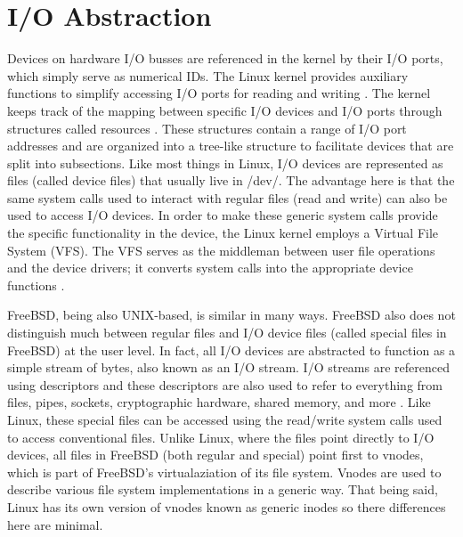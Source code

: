 \documentclass[onecolumn, draftclsnofoot,10pt, compsoc]{IEEEtran}
\begin{document}
\section{I/O Abstraction}
Devices on hardware I/O busses are referenced in the kernel by their I/O ports, which simply serve as numerical IDs. The Linux kernel provides auxiliary functions to simplify accessing I/O ports for reading and writing \cite{LinuxKernel}. The kernel keeps track of the mapping between specific I/O devices and I/O ports through structures called resources \cite{LinuxKernel}. These structures contain a range of I/O port addresses and are organized into a tree-like structure to facilitate devices that are split into subsections. Like most things in Linux, I/O devices are represented as files (called device files) that usually live in /dev/. The advantage here is that the same system calls used to interact with regular files (read and write) can also be used to access I/O devices. In order to make these generic system calls provide the specific functionality in the device, the Linux kernel employs a Virtual File System (VFS). The VFS serves as the middleman between user file operations and the device drivers; it converts system calls into the appropriate device functions \cite{LinuxKernel}.

FreeBSD, being also UNIX-based, is similar in many ways. FreeBSD also does not distinguish much between regular files and I/O device files (called special files in FreeBSD) at the user level. In fact, all I/O devices are abstracted to function as a simple stream of bytes, also known as an I/O stream. I/O streams are referenced using descriptors and these descriptors are also used to refer to everything from files, pipes, sockets, cryptographic hardware, shared memory, and more \cite{FreeBSD}. Like Linux, these special files can be accessed using the read/write system calls used to access conventional files. Unlike Linux, where the files point directly to I/O devices, all files in FreeBSD (both regular and special) point first to vnodes, which is part of FreeBSD's virtualaziation of its file system. Vnodes are used to describe various file system implementations in a generic way. That being said, Linux has its own version of vnodes known as generic inodes so there differences here are minimal.
\end{document}
